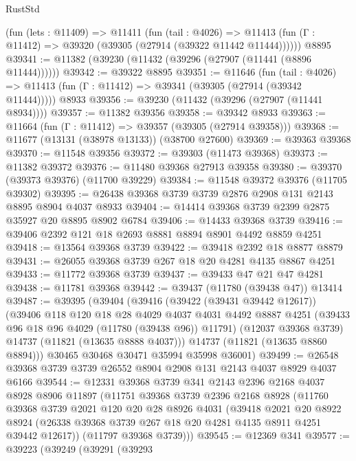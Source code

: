 \begin{lexlean}{RustStd}
\begin{coremodule}
    (fun (lets : @11409) =>
    @11411
      (fun (tail : @4026) =>
      @11413 (fun (Γ : @11412) => @39320 (@39305 (@27914 (@39322 @11442 @11444))))))
    @8895
@39341 := @11382 (@39230 (@11432 (@39296 (@27907 (@11441 (@8896 @11444))))))
@39342 := @39322 @8895
@39351 := @11646
    (fun (tail : @4026) => @11413 (fun (Γ : @11412) => @39341 (@39305 (@27914 (@39342 @11444)))))
    @8933
@39356 := @39230 (@11432 (@39296 (@27907 (@11441 @8934))))
@39357 := @11382 @39356
@39358 := @39342 @8933
@39363 := @11664 (fun (Γ : @11412) => @39357 (@39305 (@27914 @39358)))
@39368 := @11677 (@13131 (@38978 @13133)) (@38700 @27600)
@39369 := @39363 @39368
@39370 := @11548 @39356
@39372 := @39303 (@11473 @39368)
@39373 := @11382 @39372
@39376 := @11480 @39368 @27913 @39358
@39380 := @39370 (@39373 @39376) (@11700 @39229)
@39384 := @11548 @39372 @39376 (@11705 @39302)
@39395 := @26438 @39368 @3739 @3739 @2876 @2908 @131 @2143 @8895 @8904 @4037 @8933
@39404 := @14414 @39368 @3739 @2399 @2875 @35927 @20 @8895 @8902 @6784
@39406 := @14433 @39368 @3739
@39416 := @39406 @2392 @121 @18 @2693 @8881 @8894 @8901 @4492 @8859 @4251
@39418 := @13564 @39368 @3739
@39422 := @39418 @2392 @18 @8877 @8879
@39431 := @26055 @39368 @3739 @267 @18 @20 @4281 @4135 @8867 @4251
@39433 := @11772 @39368 @3739
@39437 := @39433 @47 @21 @47 @4281
@39438 := @11781 @39368
@39442 := @39437 (@11780 (@39438 @47)) @13414
@39487 := @39395
    (@39404
      (@39416
        (@39422 (@39431 @39442 @12617))
        (@39406
          @118
          @120
          @18
          @28
          @4029
          @4037
          @4031
          @4492
          @8887
          @4251
          (@39433 @96 @18 @96 @4029 (@11780 (@39438 @96)) @11791)
          (@12037 @39368 @3739)
          @14737
          (@11821 (@13635 @8888 @4037)))
        @14737
        (@11821 (@13635 @8860 @8894)))
      @30465
      @30468
      @30471
      @35994
      @35998
      @36001)
@39499 := @26548 @39368 @3739 @3739 @26552 @8904 @2908 @131 @2143 @4037 @8929 @4037 @6166
@39544 := @12331
    @39368
    @3739
    @341
    @2143
    @2396
    @2168
    @4037
    @8928
    @8906
    @11897
    (@11751
      @39368
      @3739
      @2396
      @2168
      @8928
      (@11760
        @39368
        @3739
        @2021
        @120
        @20
        @28
        @8926
        @4031
        (@39418
          @2021
          @20
          @8922
          @8924
          (@26338 @39368 @3739 @267 @18 @20 @4281 @4135 @8911 @4251 @39442 @12617))
        (@11797 @39368 @3739)))
@39545 := @12369 @341
@39577 := @39223
    (@39249
      (@39291
        (@39293

\end{coremodule}
\end{lexlean}
